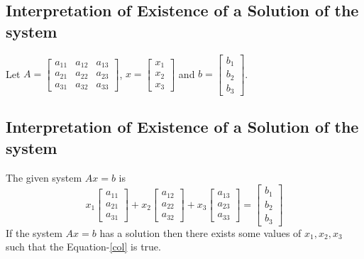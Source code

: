\documentclass[aima104_lecturenotes_ku.tex]{subfiles}
\begin{document}
 \subsection{Interpretation of Existence of a Solution of the system}
Let \(A= \displaystyle \begin{bmatrix}
    a_{11} & a_{12} & a_{13} \\
    a_{21} &a_{22} &a_{23} \\
    a_{31} & a_{32} & a_{33}
  \end{bmatrix}\), \hspace{3mm} \(x= \begin{bmatrix} x_1 \\ x_2 \\x_3 \end{bmatrix}\) and  \hspace{3mm}\(b= \begin{bmatrix} b_1 \\ b_2 \\b_3 \end{bmatrix}\).

  \subsection{Interpretation of Existence of a Solution of the system}
  The given system \(Ax=b\) is \\[2mm]
  \begin{equation}
    \label{col}
    x_1 \begin{bmatrix} a_{11} \\ a_{21} \\ a_{31} \end{bmatrix} + x_2 \begin{bmatrix} a_{12} \\ a_{22} \\ a_{32} \end{bmatrix} + x_3 \begin{bmatrix} a_{13} \\ a_{23} \\ a_{33} \end{bmatrix} = \begin{bmatrix} b_1 \\ b_2 \\b_3 \end{bmatrix}
  \end{equation}
  If the system \(Ax=b\) has a solution then there exists some values of \(x_1, x_2 , x_3\) such that the Equation-\ref{col} is true.
\end{document}
